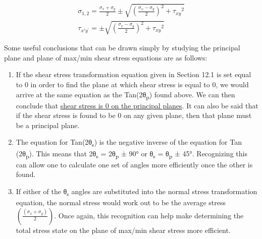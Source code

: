 \documentclass[
  letterpaper,
  DIV=11,
  numbers=noendperiod]{scrreprt}
\begin{document}
\[
\begin{gathered}
\sigma_{1,2}=\frac{\sigma_x+\sigma_y}{2} \pm \sqrt{\left(\frac{\sigma_x-\sigma_y}{2}\right)^2+\tau_{x y}{ }^2} \\
\tau_{x \prime y^{\prime}}= \pm \sqrt{\left(\frac{\sigma_x-\sigma_y}{2}\right)^2+\tau_{x y}{ }^2}
\end{gathered}
\]

Some useful conclusions that can be drawn simply by studying the
principal plane and plane of max/min shear stress equations are as
follows:

\begin{enumerate}
\def\labelenumi{\arabic{enumi}.}
\item
  If the shear stress transformation equation given in Section 12.1 is
  set equal to 0 in order to find the plane at which shear stress is
  equal to 0, we would arrive at the same equation as the
  Tan(2θ\textsubscript{p}) found above. We can then conclude that
  \ul{shear stress is 0 on the principal planes}. It can also be said
  that if the shear stress is found to be 0 on any given plane, then
  that plane must be a principal plane.
\item
  The equation for Tan(2θ\textsubscript{s}) is the negative inverse of
  the equation for Tan (2θ\textsubscript{p}). This means that
  2θ\textsubscript{s} = 2θ\textsubscript{p} ± 90° or θ\textsubscript{s}
  = θ\textsubscript{p} ± 45°. Recognizing this can allow one to
  calculate one set of angles more efficiently once the other is found.
\item
  If either of the θ\textsubscript{s} angles are substituted into the
  normal stress transformation equation, the normal stress would work
  out to be the average stress
  \(\left(\frac{\left(\sigma_x+\sigma_y\right)}{2}\right)\). Once again,
  this recognition can help make determining the total stress state on
  the plane of max/min shear stress more efficient.
\end{enumerate}
\end{document}
